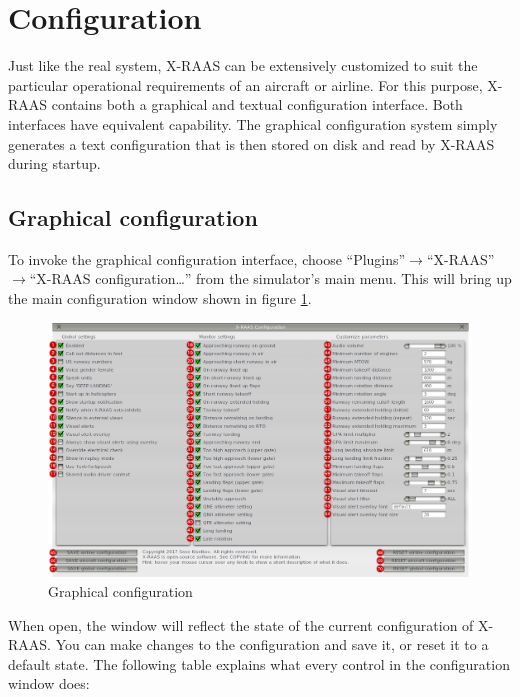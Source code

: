 \documentclass[a4paper,12pt]{article}
\begin{document}
\section{Configuration}
\label{sec:Configuration}

Just like the real system, X-RAAS can be extensively customized to suit
the particular operational requirements of an aircraft or airline. For
this purpose, X-RAAS contains both a graphical and textual configuration
interface. Both interfaces have equivalent capability. The graphical
configuration system simply generates a text configuration that is then
stored on disk and read by X-RAAS during startup.

\subsection{Graphical configuration}
\label{subsec:GUIConfiguration}

To invoke the graphical configuration interface, choose
``Plugins''$\rightarrow$``X-RAAS''$\rightarrow$``X-RAAS configuration\ldots''
from the simulator's main menu. This will bring up the main
configuration window shown in figure \ref{GUIConfigurationWindow}.

\begin{figure}[H]
\vspace{.5em}
\begin{center}
\includegraphics[width=\textwidth]{../src/config_window_annotated.png}
\end{center}
\caption{Graphical configuration}
\label{GUIConfigurationWindow}
\end{figure}

\noindent When open, the window will reflect the state of the current
configuration of X-RAAS. You can make changes to the configuration and
save it, or reset it to a default state. The following table explains
what every control in the configuration window does:
\end{document}

